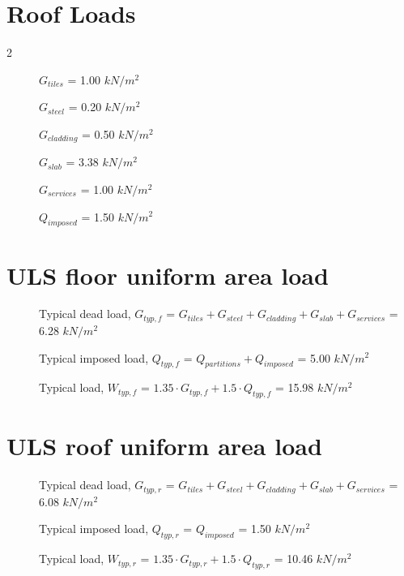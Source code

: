 \documentclass[
  letterpaper,
  DIV=11,
  numbers=noendperiod]{scrartcl}
\begin{document}
\section{Roof Loads}\label{roof-loads}

\begin{multicols}{2}
\begin{description}
    \item[]$G_{tiles}$ = 1.00 $kN/m^2$
    \item[]$G_{steel}$ = 0.20 $kN/m^2$
    \item[]$G_{cladding}$ = 0.50 $kN/m^2$
    \item[]$G_{slab}$ = 3.38 $kN/m^2$
    \item[]$G_{services}$ = 1.00 $kN/m^2$
    \item[]$Q_{imposed}$ = 1.50 $kN/m^2$
\end{description}
\end{multicols}

\newpage{}

\section{}\label{section-6}

\section{ULS floor uniform area load}\label{uls-floor-uniform-area-load}

\begin{description}
    \item[]Typical dead load, $G_{typ,f}$ = $G_{tiles} + G_{steel} + G_{cladding} + G_{slab} + G_{services}$ = 6.28 $kN/m^2$
    \item[]Typical imposed load, $Q_{typ,f}$ = $Q_{partitions} + Q_{imposed}$ = 5.00 $kN/m^2$
    \item[]Typical load, $W_{typ,f}$ = $1.35\cdot G_{typ,f} + 1.5 \cdot Q_{typ,f}$ = 15.98 $kN/m^2$
\end{description}

\section{ULS roof uniform area load}\label{uls-roof-uniform-area-load}

\begin{description}
    \item[]Typical dead load, $G_{typ,r}$ = $G_{tiles} + G_{steel} + G_{cladding} + G_{slab} + G_{services}$ = 6.08 $kN/m^2$
    \item[]Typical imposed load, $Q_{typ,r}$ = $Q_{imposed}$ = 1.50 $kN/m^2$
    \item[]Typical load, $W_{typ,r}$ = $1.35\cdot G_{typ,r} + 1.5 \cdot Q_{typ,r}$ = 10.46 $kN/m^2$
\end{description}
\end{document}
